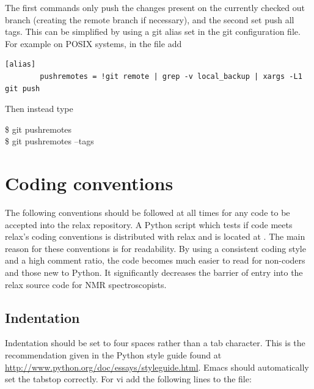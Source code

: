 The first commands only push the changes present on the currently checked out branch (creating the remote branch if necessary), and the second set push all tags.
This can be simplified by using a git alias set in the git configuration file.
For example on POSIX systems, in the file  add

\begin{footnotesize}
\begin{verbatim}
[alias]
        pushremotes = !git remote | grep -v local_backup | xargs -L1 git push
\end{verbatim}
\end{footnotesize}

Then instead type

\begin{exampleenv}
\$ git pushremotes \\
\$ git pushremotes --tags
\end{exampleenv}




\section{Coding conventions}

The following conventions should be followed at all times for any code to be accepted into the relax repository.
A Python script which tests if code meets relax's coding conventions is distributed with relax and is located at .
The main reason for these conventions is for readability.
By using a consistent coding style and a high comment ratio, the code becomes much easier to read for non-coders and those new to Python.
It significantly decreases the barrier of entry into the relax source code for NMR spectroscopists.



\subsection{Indentation}

Indentation should be set to four spaces rather than a tab character.
This is the recommendation given in the Python style guide found at \url{http://www.python.org/doc/essays/styleguide.html}.
Emacs should automatically set the tabstop correctly.
For vi add the following lines to the  file:


